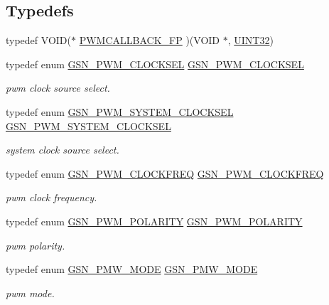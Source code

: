 \subsection*{Typedefs}
\begin{DoxyCompactItemize}
\item 
typedef VOID($\ast$ \hyperlink{a00540_aa93497a56b4caa3bd5b0084edd9d256a}{PWMCALLBACK\_\-FP} )(VOID $\ast$, \hyperlink{a00660_gae1e6edbbc26d6fbc71a90190d0266018}{UINT32})
\item 
typedef enum \hyperlink{a00650_gafda5110eb592af71b799ed22c7ebf902}{GSN\_\-PWM\_\-CLOCKSEL} \hyperlink{a00650_ga6c0d8b08ff5dfcf29b094374033312e9}{GSN\_\-PWM\_\-CLOCKSEL}
\begin{DoxyCompactList}\small\item\em pwm clock source select. \end{DoxyCompactList}\item 
typedef enum \hyperlink{a00650_ga110e33b4ac34f5c1b7e1f1e3b27d2281}{GSN\_\-PWM\_\-SYSTEM\_\-CLOCKSEL} \hyperlink{a00650_ga5b3a1c776cee49d77ba7c367502eeb53}{GSN\_\-PWM\_\-SYSTEM\_\-CLOCKSEL}
\begin{DoxyCompactList}\small\item\em system clock source select. \end{DoxyCompactList}\item 
typedef enum \hyperlink{a00650_ga52371d0feb719879e34584cfa2ef6733}{GSN\_\-PWM\_\-CLOCKFREQ} \hyperlink{a00650_ga66c6af105ee29581b24b10edad6bb0b9}{GSN\_\-PWM\_\-CLOCKFREQ}
\begin{DoxyCompactList}\small\item\em pwm clock frequency. \end{DoxyCompactList}\item 
typedef enum \hyperlink{a00650_gaea0350ae8992c56b4a1bad6bc7ad5de1}{GSN\_\-PWM\_\-POLARITY} \hyperlink{a00650_ga852441593095a912d86bc01bbe8678f0}{GSN\_\-PWM\_\-POLARITY}
\begin{DoxyCompactList}\small\item\em pwm polarity. \end{DoxyCompactList}\item 
typedef enum \hyperlink{a00650_ga2ce321cf068e815e8a30642d73f1bdd4}{GSN\_\-PMW\_\-MODE} \hyperlink{a00650_gae68dbc7fb3fb9bb56a6d4abcbbba43b2}{GSN\_\-PMW\_\-MODE}
\begin{DoxyCompactList}\small\item\em pwm mode. \end{DoxyCompactList}\item 

\end{DoxyCompactItemize}
